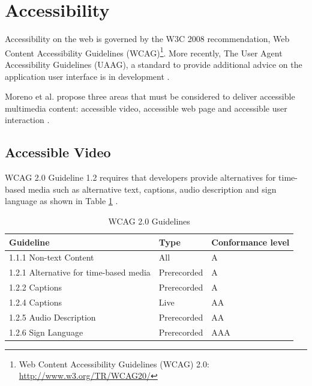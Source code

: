 \documentclass[journal]{IEEEtran}
\begin{document}
\section{Accessibility}
Accessibility on the web is governed by the W3C 2008 recommendation, Web Content Accessibility Guidelines (WCAG)\footnote{Web Content Accessibility Guidelines (WCAG) 2.0: \url{http://www.w3.org/TR/WCAG20/}}. More recently, The User Agent Accessibility Guidelines (UAAG), a standard to provide additional advice on the application user interface is in development \cite{website:implementingUAAG}.

Moreno et al. propose three areas that must be considered to deliver accessible multimedia content: accessible video, accessible web page and accessible user interaction \cite{article:disablityStandardsForMultimediaOnTheWeb}.

\subsection{Accessible Video}
WCAG 2.0 Guideline 1.2 requires that developers provide alternatives for time-based media such as alternative text, captions, audio description and sign language as shown in Table \ref{tab:wcag2Guidelines} \cite{standard:wcag2}.

\begin{table}
  \caption{WCAG 2.0 Guidelines\cite{standard:wcag2}}
  \label{tab:wcag2Guidelines}
    \begin{tabular}{|l|l|l|}
    \hline
    \textbf{Guideline}          & \textbf{Type} & \textbf{Conformance level} \\ \hline
    1.1.1 Non-text Content                 & All         & A                 \\ \hline
    1.2.1 Alternative for time-based media & Prerecorded & A                 \\ \hline
    1.2.2 Captions                         & Prerecorded & A                 \\ \hline
    1.2.4 Captions                         & Live        & AA                \\ \hline
    1.2.5 Audio Description                & Prerecorded & AA                \\ \hline
    1.2.6 Sign Language                    & Prerecorded & AAA               \\ \hline
    \end{tabular}
\end{table}
\end{document}

